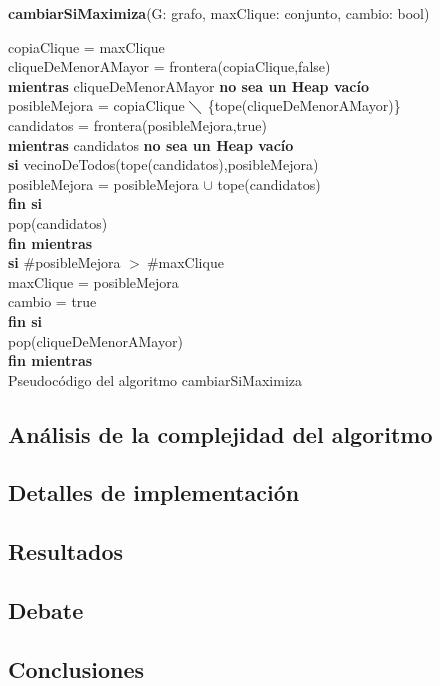 \textbf{cambiarSiMaximiza}(G: grafo, maxClique: conjunto, cambio: bool) \\
\begin{algorithm}[H]
	\BlankLine
	copiaClique = maxClique\\
	cliqueDeMenorAMayor = frontera(copiaClique,false)\\

	\textbf{mientras} cliqueDeMenorAMayor \textbf{no sea un Heap vacío}\\

		\tab posibleMejora = copiaClique $\diagdown$ \{tope(cliqueDeMenorAMayor)\}\\

		\tab candidatos = frontera(posibleMejora,true)\\
		
		\tab \textbf{mientras} candidatos \textbf{no sea un Heap vacío}\\
			\tab \tab \textbf{si} vecinoDeTodos(tope(candidatos),posibleMejora)\\
				\tab \tab \tab posibleMejora = posibleMejora $\cup$ tope(candidatos)\\
			\tab \tab \textbf{fin si}\\
			\tab \tab pop(candidatos)\\
		\tab \textbf{fin mientras}\\


		\tab \textbf{si} $\#$posibleMejora $>\ \#$maxClique\\
			\tab \tab maxClique = posibleMejora\\
			\tab \tab cambio = true\\
		\tab \textbf{fin si}\\
		\tab pop(cliqueDeMenorAMayor)\\
	\textbf{fin mientras}\\

\caption{Pseudocódigo del algoritmo cambiarSiMaximiza}
\end{algorithm}

\vspace{3em}








\normalsize
\subsection{Análisis de la complejidad del algoritmo}
\subsection{Detalles de implementación}
\subsection{Resultados}
\subsection{Debate}
\subsection{Conclusiones}
